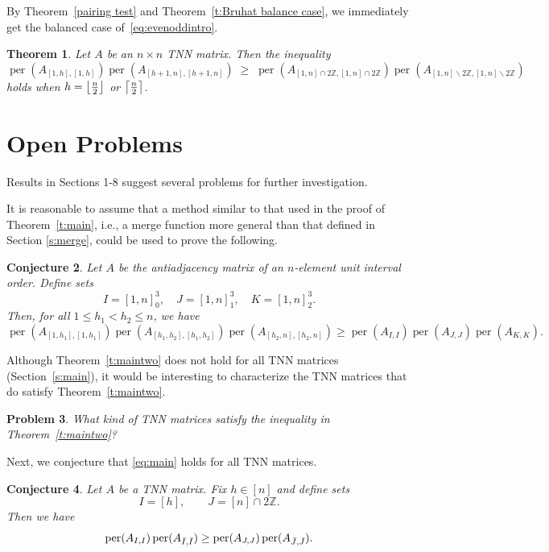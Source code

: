 \documentclass[12pt]{amsart}
\DeclarePairedDelimiter\ceil{\lceil}{\rceil}
\DeclarePairedDelimiter\floor{\lfloor}{\rfloor}
\newtheorem{thm}{Theorem}[section]
\newtheorem{conj}[thm]{Conjecture}
\newtheorem{prob}[thm]{Problem}
\theoremstyle{definition}
\numberwithin{equation}{section}
\DeclareMathOperator{\perm}{per}
\newcommand{\ssm}{\smallsetminus}
\begin{document}
By Theorem~\ref{pairing test} and Theorem~\ref{t:Bruhat balance case}, we immediately get the balanced case of~\eqref{eq:evenoddintro}.

\begin{thm}
    Let $A$ be an $n \times n$ TNN matrix. Then the inequality
    \begin{equation*}
        \perm(A_{[1,h],[1,h]}) \perm(A_{[h+1,n],[h+1,n]}) \;\geq\;
    \perm(A_{[1,n] \cap 2\mathbb Z, [1,n] \cap 2\mathbb Z})
    \perm(A_{[1,n] \ssm 2\mathbb Z, [1,n] \ssm 2\mathbb Z})
    \end{equation*}
    holds when $h = \floor*{\tfrac{n}{2}}$ or $\ceil*{\tfrac{n}{2}}$.
\end{thm}


\section{Open Problems}\label{s:open}

Results in Sections 1-8 suggest several problems for further investigation.

It is reasonable to assume that a method similar to that used in the proof of
Theorem~\ref{t:main}, i.e.,
a merge function more general than that defined in Section \ref{s:merge}, could be used to prove the following.
\begin{conj}
    Let $A$ be the antiadjacency matrix of an $n$-element unit interval order. Define sets
    \begin{equation*}
    I= [1,n]_0^3, \quad J = [1,n]_1^3, \quad K = [1,n]_2^3.
    \end{equation*}
    Then, for all $1\leq h_1 < h_2 \leq n$, we have
    \begin{equation*}
        \perm(A_{[1,h_1],[1,h_1]}) \perm(A_{[h_1,h_2],[h_1,h_2]}) \perm(A_{[h_2,n],[h_2,n]}) \geq \perm(A_{I,I}) \perm(A_{J,J}) \perm(A_{K,K}).
    \end{equation*}
\end{conj}

Although Theorem~\ref{t:maintwo} does not hold for
all TNN matrices (Section~\ref{s:main}), it would be interesting to characterize the TNN matrices that do satisfy Theorem~\ref{t:maintwo}.

\begin{prob}
    What kind of TNN matrices satisfy the inequality in Theorem~\ref{t:maintwo}?
\end{prob}

Next, we conjecture that \eqref{eq:main} holds for all TNN matrices.
\begin{conj}
    Let $A$ be a TNN matrix.
  Fix $h \in [n]$ and define sets
  \begin{equation*}
      I = [h] ,\qquad
      J = [n] \cap 2 \mathbb Z.
  \end{equation*}
  Then we have
  \begin{equation*}
    \perm(A_{I,I})\perm(A_{\Bar I, \Bar I}) \geq \perm(A_{J,J})\perm(A_{\Bar J, \Bar J}).
  \end{equation*}
\end{conj}
\end{document}

